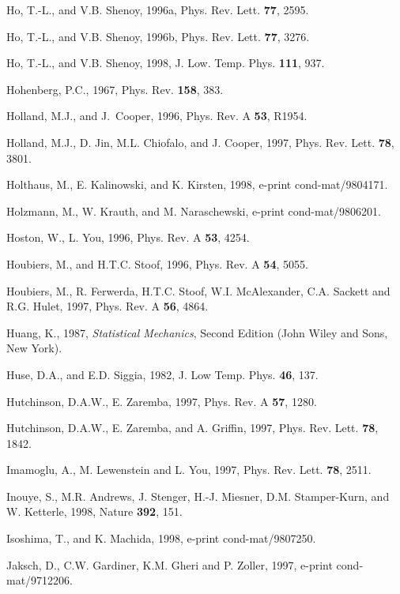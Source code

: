 \begin{references}
      Ho, T.-L., and V.B. Shenoy, 1996a, Phys. Rev. Lett.
{\bf 77}, 2595.

      Ho, T.-L., and V.B. Shenoy, 1996b, Phys. Rev. Lett.
{\bf 77}, 3276.

       Ho, T.-L., and V.B. Shenoy, 1998, J. Low. Temp. Phys.
{\bf 111}, 937. 

 Hohenberg, P.C., 1967, Phys. Rev. {\bf 158}, 383.

  Holland, M.J., and J.\ Cooper, 1996, Phys. Rev. A
{\bf 53}, R1954.

  Holland, M.J., D. Jin,  M.L. Chiofalo, and  J.
Cooper, 1997, Phys. Rev. Lett.  {\bf 78},  3801.

 Holthaus, M., E. Kalinowski, and K. Kirsten, 1998,
e-print cond-mat/9804171.

  Holzmann, M., W. Krauth, and M. Naraschewski,
e-print cond-mat/9806201.  

   Hoston, W., L. You, 1996, Phys. Rev. A {\bf 53},
4254.

   Houbiers, M., and H.T.C. Stoof, 1996, Phys. Rev.
A {\bf 54}, 5055. 

   Houbiers, M., R. Ferwerda, H.T.C. Stoof, W.I.
McAlexander, C.A. Sackett and R.G. Hulet, 1997, Phys. Rev. A {\bf 56},
4864.

    Huang, K., 1987, {\it Statistical Mechanics}, Second
Edition (John Wiley and Sons, New York).

     Huse, D.A., and E.D.  Siggia, 1982, J. Low Temp. 
Phys.  {\bf 46}, 137.

 Hutchinson, D.A.W., E. Zaremba, 1997, Phys. Rev.
A {\bf 57}, 1280. 

 Hutchinson, D.A.W., E. Zaremba, and A. Griffin,
1997, Phys. Rev. Lett. {\bf 78}, 1842.

 Imamoglu, A., M. Lewenstein and L. You, 1997,
Phys. Rev. Lett. {\bf 78}, 2511. 

   Inouye, S., M.R. Andrews, J. Stenger, H.-J.
Miesner, D.M. Stamper-Kurn, and W. Ketterle, 1998, Nature {\bf 392}, 151.

  Isoshima, T., and K. Machida, 1998, e-print
cond-mat/9807250. 

 Jaksch, D., C.W. Gardiner, K.M. Gheri and P. Zoller,
1997, e-print cond-mat/9712206.


\end{references}
